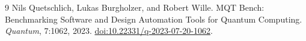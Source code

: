 \begin{thebibliography}{9}
Nils Quetschlich, Lukas Burgholzer, and Robert Wille.
\newblock MQT Bench: Benchmarking Software and Design Automation Tools for Quantum Computing.
\newblock \emph{Quantum}, 7:1062, 2023.
\newblock \href{https://doi.org/10.22331/q-2023-07-20-1062}{doi:10.22331/q-2023-07-20-1062}.

\end{thebibliography}
